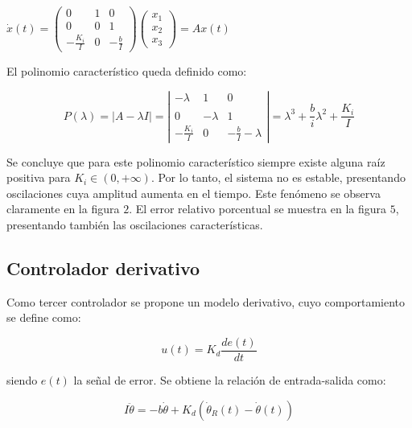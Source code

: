 \documentclass{sig-alternate}
\begin{document}
\begin{center}
$
\dot x(t) = 
\left( \begin{array}{ccc}
0 & 1 & 0\\
0 & 0 & 1\\
-\frac{K_i}{I} & 0 & -\frac{b}{I}
\end{array} \right)
\left( \begin{array}{c}
x_1 \\
x_2 \\
x_3
\end{array} \right)
= Ax(t)
$
\end{center}

El polinomio caracter\'istico queda definido como:

\begin{equation}
 P( \lambda ) = |A - \lambda I| = 
\left| \begin{array}{ccc}
-\lambda & 1 & 0\\
\\ 0 & -\lambda & 1 \\
-\frac{K_i}{I} & 0 & -\frac{b}{I}-\lambda
\end{array} \right| 
=
\lambda^3 + \frac{b}{i}\lambda^2 + \frac{K_i}{I}
\end{equation}

Se concluye que para este polinomio caracter\'istico 
siempre existe alguna ra\'iz positiva para $K_i \in (0,+\infty)$. Por lo tanto, 
el sistema no es estable, presentando oscilaciones cuya amplitud aumenta
en el tiempo. Este fen\'{o}meno se observa claramente en la figura $2$.
El error relativo porcentual se muestra en la figura $5$, presentando tambi\'{e}n
las oscilaciones caracter\'{i}sticas.

\subsection{Controlador derivativo}\label{derivativo}
Como tercer controlador se propone un modelo derivativo, cuyo comportamiento
se define como:

\begin{equation}
\label{error_modelo3}
u(t) = K_d \frac{d e(t)}{d t}
\end{equation}

siendo $e(t)$ la se\~{n}al de error. Se obtiene la relaci\'{o}n de entrada-salida 
como:

\begin{equation}
\label{ecuacion_modelo2b}
I \ddot\theta = - b \dot\theta + K_d (\dot\theta_R(t) - \dot\theta(t))
\end{equation}
\end{document}
